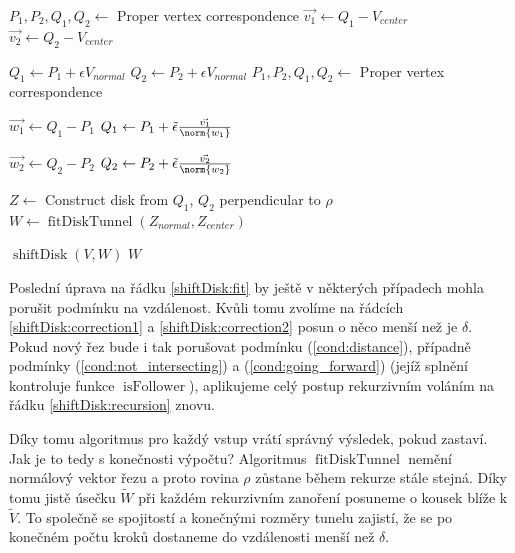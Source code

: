 \begin{algorithmic}[1]
\label{alg:shiftDisk}

    \State $ P_1, P_2, Q_1, Q_2 \gets $ Proper vertex correspondence
    \State $ \vec{v_1} \gets Q_1 - V_{center} $
    \State $ \vec{v_2} \gets Q_2 - V_{center} $
    \Statex

        \State $ Q_1 \gets P_1 + \epsilon V_{normal} $
        \State $ Q_2 \gets P_2 + \epsilon V_{normal} $
    \EndIf
    \State $ P_1, P_2, Q_1, Q_2 \gets $ Proper vertex correspondence
    \Statex

    \State $ \vec{w_1} \gets Q_1 - P_1 $
        $ Q_1 \gets P_1 + \tilde{\epsilon} \frac{\vec{v_1}}{\norm{w_1}} $ \label{shiftDisk:correction1}
    \EndIf

    \State $ \vec{w_2} \gets Q_2 - P_2 $
        $ Q_2 \gets P_2 + \tilde{\epsilon} \frac{\vec{v_2}}{\norm{w_2}} $ \label{shiftDisk:correction2}
    \EndIf
    \Statex

    \State $ Z \gets $ Construct disk from $ Q_1$, $Q_2$ perpendicular to $ \rho $
    \State $ W \gets \operatorname{fitDiskTunnel}(Z_{normal}, Z_{center}) $ \label{shiftDisk:fit}
    \Statex

        \State \Return $ \operatorname{shiftDisk}(V, W) $ \label{shiftDisk:recursion}
    \Else
        \State \Return $ W $
    \EndIf

\EndFunction

\end{algorithmic}

Poslední úprava na řádku \ref{shiftDisk:fit} by ještě v některých případech mohla
porušit podmínku na vzdálenost. Kvůli tomu zvolíme na řádcích
\ref{shiftDisk:correction1} a \ref{shiftDisk:correction2} posun o něco
menší než je $ \delta $. Pokud nový řez bude i tak porušovat podmínku (\ref{cond:distance}),
případně podmínky (\ref{cond:not_intersecting}) a (\ref{cond:going_forward})
(jejíž splnění kontroluje funkce $ \operatorname{isFollower} $),
aplikujeme celý postup rekurzivním voláním na řádku \ref{shiftDisk:recursion} znovu.

Díky tomu algoritmus pro každý vstup vrátí správný výsledek, pokud zastaví.
Jak je to tedy s konečnosti výpočtu? Algoritmus $\operatorname{fitDiskTunnel} $
nemění normálový vektor řezu a proto
rovina $ \rho $ zůstane během rekurze stále stejná. Díky tomu jistě úsečku
$ \widetilde{W} $ při každém rekurzivním zanoření posuneme o kousek blíže k
$ \widetilde{V} $. To společně se spojitostí a konečnými rozměry tunelu zajistí,
že se po konečném počtu kroků dostaneme do vzdálenosti menší než $ \delta $.

